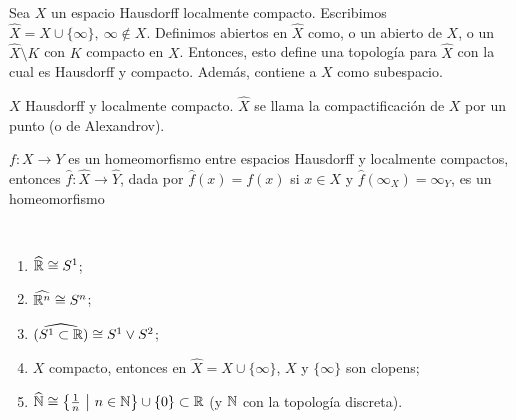 \begin{theorem}
	Sea $X$ un espacio Hausdorff localmente compacto. Escribimos $\hat{X} = X \cup \{\infty\},\ \infty \not\in X$. Definimos abiertos en $\hat{X}$ como, o un abierto de $X$, o un $\hat{X} \setminus K$ con $K$ compacto en $X$. Entonces, esto define una topología para $\hat{X}$ con la cual es Hausdorff y compacto. Además, contiene a $X$ como subespacio.
\end{theorem}

\begin{definition}
	$X$ Hausdorff y localmente compacto. $\hat{X}$ se llama la compactificación de $X$ por un punto (o de Alexandrov).
\end{definition}

\begin{theorem}
	$f : X \to Y$ es un homeomorfismo entre espacios Hausdorff y localmente compactos, entonces $\hat{f} : \hat{X} \to \hat{Y}$, dada por $\hat{f}(x) = f(x)$ si $x \in X$ y $\hat{f}(\infty_X) = \infty_Y$, es un homeomorfismo
\end{theorem}

\begin{eg}~
	\begin{enumerate}
		\item $\widehat{\mathbb{R}} \cong S^1$;

		\item $\widehat{\mathbb{R}^n} \cong S^n$;
		
		\item $\widehat{(S^1 \subset \mathbb{R})} \cong S^1 \vee S^2$;

		\item $X$ compacto, entonces en $\widehat{X} = X \cup \{\infty\}$, $X$ y $\{\infty\}$ son clopens;

		\item $\widehat{\mathbb{N}} \cong \left\{\frac{1}{n} \ \big| \ n \in \mathbb{N}\right\} \cup \{0\} \subset \mathbb{R}$ (y $\mathbb{N}$ con la topología discreta).
	\end{enumerate}
\end{eg}
